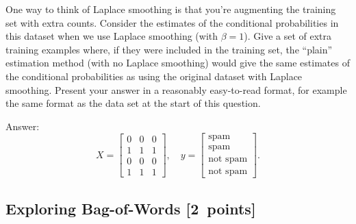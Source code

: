 \documentclass{article}
\newcommand{\blu}[1]{{\textcolor{blu}{#1}}}
\newenvironment{answer}{\par\begingroup\color{gre}Answer: }{\endgroup}
\let\ask\blu
\newcommand\pts[1]{\textcolor{pointscolour}{[#1~points]}}
\begin{document}
    One way to think of Laplace smoothing is that you're augmenting the training set with extra counts. Consider the estimates of the conditional probabilities in this dataset when we use Laplace smoothing (with $\beta = 1$).
    \ask{Give a set of extra training examples where, if they were included in the training set, the ``plain'' estimation method (with no Laplace smoothing) would give the same estimates of the conditional probabilities as using the original dataset with Laplace smoothing.}
    Present your answer in a reasonably easy-to-read format, for example the same format as the data set at the start of this question.
    \begin{answer}
        \[
        X = \begin{bmatrix}
            0 & 0 & 0\\
            1 & 1 & 1\\
            0 & 0 & 0\\
            1 & 1 & 1
        \end{bmatrix},
        \quad y = \begin{bmatrix}
            \text{spam}\\
            \text{spam}\\
            \text{not spam}\\
            \text{not spam}
        \end{bmatrix}.
        \]
    \end{answer}

    \subsection{Exploring Bag-of-Words \pts{2}}
\end{document}
